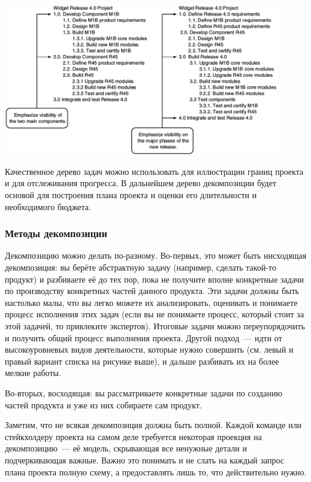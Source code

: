 \documentclass{../../text-style}
\begin{document}
\begin{center}
    \includegraphics[width=0.9\textwidth]{wbsExample2.png}
\end{center}

Качественное дерево задач можно использовать для иллюстрации границ проекта и для отслеживания прогресса. В дальнейшем дерево декомпозиции будет основой для построения плана проекта и оценки его длительности и необходимого бюджета.

\subsubsection{Методы декомпозиции}

Декомпозицию можно делать по-разному. Во-первых, это может быть нисходящая декомпозиция: вы берёте абстрактную задачу (например, сделать такой-то продукт) и разбиваете её до тех пор, пока не получите вполне конкретные задачи по производству конкретных частей данного продукта. Эти задачи должны быть настолько малы, что вы легко можете их анализировать, оценивать и понимаете процесс исполнения этих задач (если вы не понимаете процесс, который стоит за этой задачей, то привлеките экспертов). Итоговые задачи можно переупорядочить и получить общий процесс выполнения проекта. Другой подход~--- идти от высокоуровневых видов деятельности, которые нужно совершить (см. левый и правый вариант списка на рисунке выше), и дальше разбивать их на более мелкие работы.

Во-вторых, восходящая: вы рассматриваете конкретные задачи по созданию частей продукта и уже из них собираете сам продукт.

Заметим, что не всякая декомпозиция должна быть полной. Каждой команде или стейкхолдеру проекта на самом деле требуется некоторая проекция на декомпозицию~--- её модель, скрывающая все ненужные детали и подчеркивающая важные. Важно это понимать и не слать на каждый запрос плана проекта полную схему, а предоставлять лишь то, что действительно нужно.
\end{document}
